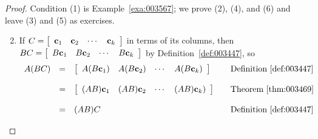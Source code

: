 \vspace*{-0.5em}\begin{proof} Condition (1) is Example~\ref{exa:003567}; we prove (2), (4), and (6) and leave (3) and (5) as exercises.
\begin{enumerate}
\setcounter{enumi}{1}
\item If $C = \left[ \begin{array}{cccc}
\textbf{c}_{1} & \textbf{c}_{2} & \cdots & \textbf{c}_{k}
\end{array} \right]$ in terms of its columns, then $BC = \left[ \begin{array}{cccc}
B\textbf{c}_{1} & B\textbf{c}_{2} & \cdots & B\textbf{c}_{k}
\end{array} \right]$ by Definition~\ref{def:003447}, so
\begin{equation*}
\begin{array}{lllll}
A(BC) & = & \left[ \begin{array}{rrrr}
A(B\textbf{c}_{1}) & A(B\textbf{c}_{2}) & \cdots & A(B\textbf{c}_{k}) 
\end{array} \right] & & \mbox{Definition~\ref{def:003447}} \\
& & & & \\
& = & \left[ \begin{array}{rrrr}
(AB)\textbf{c}_{1} & (AB)\textbf{c}_{2} & \cdots & (AB)\textbf{c}_{k})
\end{array} \right] & & \mbox{Theorem~\ref{thm:003469}} \\
& & & & \\
& = & (AB)C & & \mbox{Definition~\ref{def:003447}}
\end{array}
\end{equation*}


\end{enumerate}
\end{proof}
